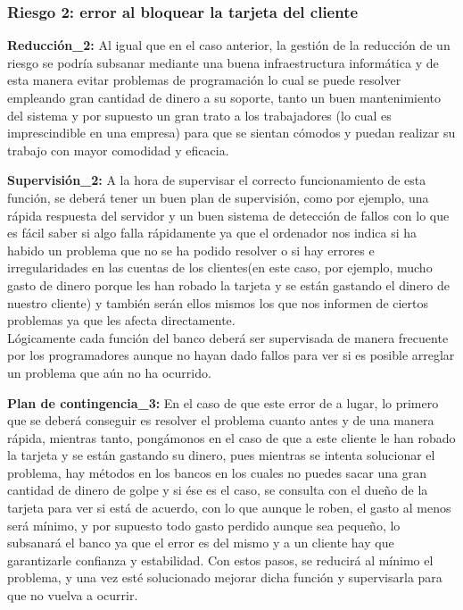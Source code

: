 \subsubsection{Riesgo 2: error al bloquear la tarjeta del cliente}
\textbf{Reducción\_2:} Al igual que en el caso anterior, la gestión de la reducción de un riesgo se podría subsanar mediante una buena infraestructura informática y de esta manera evitar problemas de programación lo cual se puede resolver empleando gran cantidad de dinero a su soporte, tanto un buen mantenimiento del sistema y por supuesto un gran trato a los trabajadores (lo cual es imprescindible en una empresa) para que se sientan cómodos y puedan realizar su trabajo con mayor comodidad y eficacia.

\textbf{Supervisión\_2:} A la hora de supervisar el correcto funcionamiento de esta función, se deberá tener un buen plan de supervisión, como por ejemplo, una rápida respuesta del servidor y un buen sistema de detección de fallos con lo que es fácil saber si algo falla rápidamente ya que el ordenador nos indica si ha habido un problema que no se ha podido resolver o si hay errores e irregularidades en las cuentas de los clientes(en este caso, por ejemplo, mucho gasto de dinero porque les han robado la tarjeta y se están gastando el dinero de nuestro cliente) y también serán ellos mismos los que nos informen de ciertos problemas ya que les afecta directamente.\\
Lógicamente cada función del banco deberá ser supervisada de manera frecuente por los programadores aunque no hayan dado fallos para ver si es posible arreglar un problema que aún no ha ocurrido.

\textbf{Plan de contingencia\_3:} En el caso de que este error de a lugar, lo primero que se deberá conseguir es resolver el problema cuanto antes y de una manera rápida, mientras tanto, pongámonos en el caso de que a este cliente le han robado la tarjeta y se están gastando su dinero, pues mientras se intenta solucionar el problema, hay métodos en los bancos en los cuales no puedes sacar una gran cantidad de dinero de golpe y si ése es el caso, se consulta con el dueño de la tarjeta para ver si está de acuerdo, con lo que aunque le roben,  el gasto al menos será mínimo, y por supuesto todo gasto perdido aunque sea pequeño, lo subsanará el banco ya que el error es del mismo y a un cliente hay que garantizarle confianza y estabilidad.
Con estos pasos, se reducirá al mínimo el problema, y una vez esté solucionado mejorar dicha función y supervisarla para que no vuelva a ocurrir.
